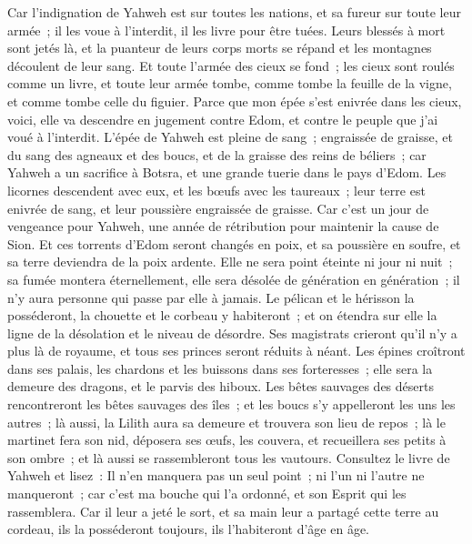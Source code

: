\begin{multicols}{2}
Car l'indignation de Yahweh est sur toutes les nations, et sa fureur sur toute leur armée~; il les voue à l'interdit, il les livre pour être tuées.
Leurs blessés à mort sont jetés là, et la puanteur de leurs corps morts se répand et les montagnes découlent de leur sang.
Et toute l'armée des cieux se fond~; les cieux sont roulés comme un livre, et toute leur armée tombe, comme tombe la feuille de la vigne, et comme tombe celle du figuier.
Parce que mon épée s'est enivrée dans les cieux, voici, elle va descendre en jugement contre Edom, et contre le peuple que j'ai voué à l'interdit.
L'épée de Yahweh est pleine de sang~; engraissée de graisse, et du sang des agneaux et des boucs, et de la graisse des reins de béliers~; car Yahweh a un sacrifice à Botsra, et une grande tuerie dans le pays d'Edom.
Les licornes descendent avec eux, et les bœufs avec les taureaux~; leur terre est enivrée de sang, et leur poussière engraissée de graisse.
Car c'est un jour de vengeance pour Yahweh, une année de rétribution pour maintenir la cause de Sion.
Et ces torrents d'Edom seront changés en poix, et sa poussière en soufre, et sa terre deviendra de la poix ardente.
Elle ne sera point éteinte ni jour ni nuit~; sa fumée montera éternellement, elle sera désolée de génération en génération~; il n'y aura personne qui passe par elle à jamais.
Le pélican et le hérisson la posséderont, la chouette et le corbeau y habiteront~; et on étendra sur elle la ligne de la désolation et le niveau de désordre.
Ses magistrats crieront qu'il n'y a plus là de royaume, et tous ses princes seront réduits à néant.
Les épines croîtront dans ses palais, les chardons et les buissons dans ses forteresses~; elle sera la demeure des dragons, et le parvis des hiboux.
Les bêtes sauvages des déserts rencontreront les bêtes sauvages des îles~; et les boucs s'y appelleront les uns les autres~; là aussi, la Lilith aura sa demeure et trouvera son lieu de repos~;
là le martinet fera son nid, déposera ses œufs, les couvera, et recueillera ses petits à son ombre~; et là aussi se rassembleront tous les vautours.
Consultez le livre de Yahweh et lisez~: Il n'en manquera pas un seul point~; ni l'un ni l'autre ne manqueront~; car c'est ma bouche qui l'a ordonné, et son Esprit qui les rassemblera.
Car il leur a jeté le sort, et sa main leur a partagé cette terre au cordeau, ils la posséderont toujours, ils l'habiteront d'âge en âge.

\end{multicols}
